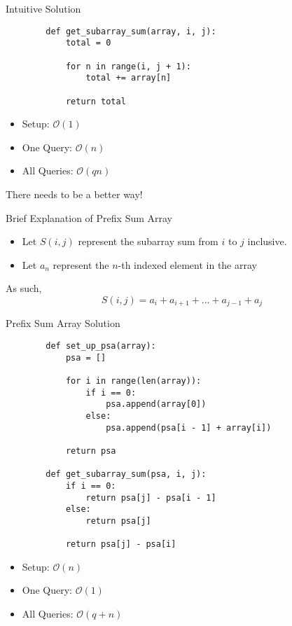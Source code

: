 \documentclass{beamer}
\begin{document}
\begin{frame}[fragile]{Intuitive Solution}
    \begin{lstlisting}
        def get_subarray_sum(array, i, j):
            total = 0
            
            for n in range(i, j + 1):
                total += array[n]
            
            return total
    \end{lstlisting}
    
    \begin{itemize}
        \item Setup: $\mathcal{O}(1)$
        \item One Query: $\mathcal{O}(n)$
        \item All Queries: $\mathcal{O}(qn)$
    \end{itemize}
    
    There needs to be a better way!
\end{frame}

\begin{frame}{Brief Explanation of Prefix Sum Array}
    \begin{itemize}
        \item Let $S(i, j)$ represent the subarray sum from $i$ to $j$ inclusive. \\
        \item Let $a_n$ represent the $n$-th indexed element in the array
    \end{itemize}
    
    As such, 
    \begin{equation*}
        S(i, j) = a_{i} + a_{i + 1} + \dots + a_{j - 1} + a_{j}
    \end{equation*}
    
    
\end{frame}

\begin{frame}[fragile]{Prefix Sum Array Solution}
    \begin{lstlisting}
        def set_up_psa(array):
            psa = []
            
            for i in range(len(array)):
                if i == 0:
                    psa.append(array[0])
                else:
                    psa.append(psa[i - 1] + array[i])
        
            return psa
        
        def get_subarray_sum(psa, i, j):
            if i == 0:
                return psa[j] - psa[i - 1]
            else:
                return psa[j]
        
            return psa[j] - psa[i]
    \end{lstlisting}
    
    \begin{itemize}
        \item Setup: $\mathcal{O}(n)$
        \item One Query: $\mathcal{O}(1)$
        \item All Queries: $\mathcal{O}(q + n)$
    \end{itemize}
\end{frame}
\end{document}
